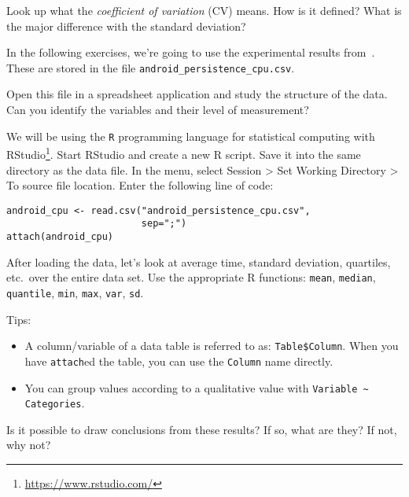 \begin{exercise}
  Look up what the \emph{coefficient of variation} (CV) means. How is it defined? What is the major difference with the standard deviation?
\end{exercise}




\begin{exercise}
  In the following exercises, we're going to use the experimental results from~\textcite{Akin2016}. These are stored in the file \texttt{android\_persistence\_cpu.csv}.

  Open this file in a spreadsheet application and study the structure of the data. Can you identify the variables and their level of measurement?

  We will be using the \texttt{R} programming language for statistical computing with RStudio\footnote{\url{https://www.rstudio.com/}}. Start RStudio and create a new R script. Save it into the same directory as the data file. In the menu, select Session > Set Working Directory > To source file location. Enter the following line of code:

\begin{lstlisting}
android_cpu <- read.csv("android_persistence_cpu.csv",
                        sep=";")
attach(android_cpu)
\end{lstlisting}

After loading the data, let's look at average time, standard deviation, quartiles, etc.~over the entire data set. Use the appropriate R functions: \texttt{mean}, \texttt{median}, \texttt{quantile}, \texttt{min}, \texttt{max}, \texttt{var}, \texttt{sd}.

Tips:

\begin{itemize}
  \item A column/variable of a data table is referred to as: \verb|Table$Column|. When you have \verb|attach|ed the table, you can use the \verb|Column| name directly.
  \item You can group values according to a qualitative value with \verb|Variable ~ Categories|.
\end{itemize}
\end{exercise}

\begin{exercise}
Is it possible to draw conclusions from these results? If so, what are they? If not, why not?
\end{exercise}

